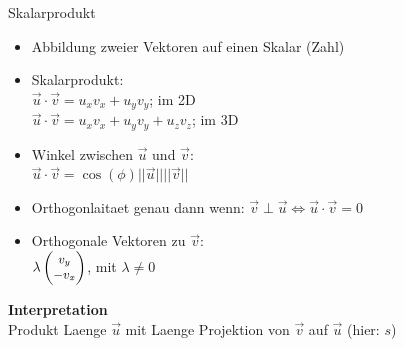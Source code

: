 \documentclass[10pt,aspectratio=169]{beamer}
\begin{document}
  \begin{frame}{Skalarprodukt}
    \begin{minipage}{9cm}
      \begin{itemize}
        \item Abbildung zweier Vektoren auf einen Skalar (Zahl)
        \item Skalarprodukt:\\
        $\vec{u}\cdot\vec{v} = u_xv_x + u_yv_y$; im 2D\\
        $\vec{u}\cdot\vec{v} = u_xv_x + u_yv_y + u_zv_z$; im 3D\\
        \item Winkel zwischen $\vec{u}$ und $\vec{v}$:\\
        \hspace{0.7cm}$\vec{u} \cdot \vec{v} = \cos(\phi)||\vec{u}||||\vec{v}||$
        \item Orthogonlaitaet genau dann wenn:
        \hspace{0.7cm}$\vec{v} \perp \vec{u} \Leftrightarrow \vec{u} \cdot \vec{v} = 0$
        \item Orthogonale Vektoren zu $\vec{v}$:\\
        \vspace{0.1cm}\hspace{0.7cm}$\lambda \small\begin{pmatrix}v_y\\ -v_x\end{pmatrix}$, \small mit $\lambda \neq 0$
      \end{itemize}
    \end{minipage}
    \begin{minipage}{4cm}
      \textbf{Interpretation}\\
      \footnotesize Produkt Laenge $\vec{u}$ mit Laenge Projektion von $\vec{v}$ auf $\vec{u}$ (hier: $s$)\\
      \vspace{0.1cm}
    \end{minipage}
  \end{frame}
\end{document}
